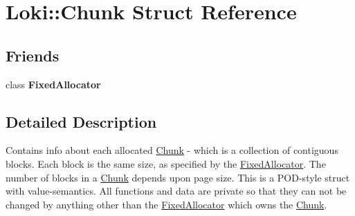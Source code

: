 \hypertarget{classLoki_1_1Chunk}{}\section{Loki\+:\+:Chunk Struct Reference}
\label{classLoki_1_1Chunk}
\subsection*{Friends}
\begin{DoxyCompactItemize}
\item 
\hypertarget{classLoki_1_1Chunk_a194171bb899e2235e83b161d504046df}{}class {\bfseries Fixed\+Allocator}\label{classLoki_1_1Chunk_a194171bb899e2235e83b161d504046df}

\end{DoxyCompactItemize}


\subsection{Detailed Description}
Contains info about each allocated \hyperlink{classLoki_1_1Chunk}{Chunk} -\/ which is a collection of contiguous blocks. Each block is the same size, as specified by the \hyperlink{classLoki_1_1FixedAllocator}{Fixed\+Allocator}. The number of blocks in a \hyperlink{classLoki_1_1Chunk}{Chunk} depends upon page size. This is a P\+O\+D-\/style struct with value-\/semantics. All functions and data are private so that they can not be changed by anything other than the \hyperlink{classLoki_1_1FixedAllocator}{Fixed\+Allocator} which owns the \hyperlink{classLoki_1_1Chunk}{Chunk}.


